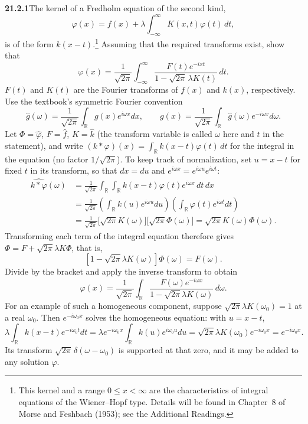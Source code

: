 \par\bigskip
\noindent\textbf{21.2.1}\quad The kernel of a Fredholm equation of
the second kind,
\[
\varphi(x)=f(x)+\lambda\int_{-\infty}^{\infty}K(x,t)\varphi(t)\,dt,
\]
is of the form $k(x-t)$.\footnote{This kernel and a range
$0\le x<\infty$ are the characteristics of integral equations of
the Wiener--Hopf type. Details will be found in Chapter~8 of Morse
and Feshbach (1953); see the Additional Readings.} Assuming that
the required transforms exist, show that
\[
\varphi(x)=\frac{1}{\sqrt{2\pi}}\int_{-\infty}^{\infty}
\frac{F(t)e^{-ixt}}{1-\sqrt{2\pi}\,\lambda K(t)}\,dt.
\]
$F(t)$ and $K(t)$ are the Fourier transforms of $f(x)$ and $k(x)$,
respectively.
\solution
Use the textbook's symmetric Fourier convention
\[
\widehat g(\omega)=\frac1{\sqrt{2\pi}}\int_{\mathbb R}
g(x)e^{i\omega x}dx,\qquad
g(x)=\frac1{\sqrt{2\pi}}\int_{\mathbb R}
\widehat g(\omega)e^{-i\omega x}d\omega.
\]
Let $\Phi=\widehat\varphi$, $F=\widehat f$, $K=\widehat k$
(the transform variable is called $\omega$ here and $t$ in the
statement), and write
$(k*\varphi)(x)=\int_{\mathbb R}k(x-t)\varphi(t)\,dt$ for the integral
in the equation (no factor $1/\sqrt{2\pi}$). To keep track of
normalization, set $u=x-t$ for fixed $t$ in its transform, so that
$dx=du$ and $e^{i\omega x}=e^{i\omega u}e^{i\omega t}$:
\[
\begin{aligned}
\widehat{k*\varphi}(\omega)
&=\frac1{\sqrt{2\pi}}\int_{\mathbb R}\!\!\int_{\mathbb R}
k(x-t)\varphi(t)e^{i\omega x}\,dt\,dx\\
&=\frac1{\sqrt{2\pi}}
\left(\int_{\mathbb R}k(u)e^{i\omega u}du\right)
\left(\int_{\mathbb R}\varphi(t)e^{i\omega t}dt\right)\\
&=\frac1{\sqrt{2\pi}}\bigl[\sqrt{2\pi}K(\omega)\bigr]
\bigl[\sqrt{2\pi}\Phi(\omega)\bigr]
=\sqrt{2\pi}K(\omega)\Phi(\omega).
\end{aligned}
\]
Transforming each term of the integral equation therefore gives
$\Phi=F+\sqrt{2\pi}\lambda K\Phi$, that is,
\[
[1-\sqrt{2\pi}\lambda K(\omega)]\Phi(\omega)=F(\omega).
\]
Divide by the bracket and apply the inverse transform to obtain
\[
\boxed{\varphi(x)=\frac1{\sqrt{2\pi}}\int_{\mathbb R}
\frac{F(\omega)e^{-i\omega x}}
{1-\sqrt{2\pi}\lambda K(\omega)}\,d\omega}.
\]
For an example of such a homogeneous component, suppose
$\sqrt{2\pi}\lambda K(\omega_0)=1$ at a real $\omega_0$. Then
$e^{-i\omega_0x}$ solves the homogeneous equation: with $u=x-t$,
\[
\lambda\int_{\mathbb R}k(x-t)e^{-i\omega_0t}dt
=\lambda e^{-i\omega_0x}\int_{\mathbb R}k(u)e^{i\omega_0u}du
=\sqrt{2\pi}\lambda K(\omega_0)e^{-i\omega_0x}=e^{-i\omega_0x}.
\]
Its transform $\sqrt{2\pi}\,\delta(\omega-\omega_0)$ is supported at
that zero, and it may be added to any solution $\varphi$.


